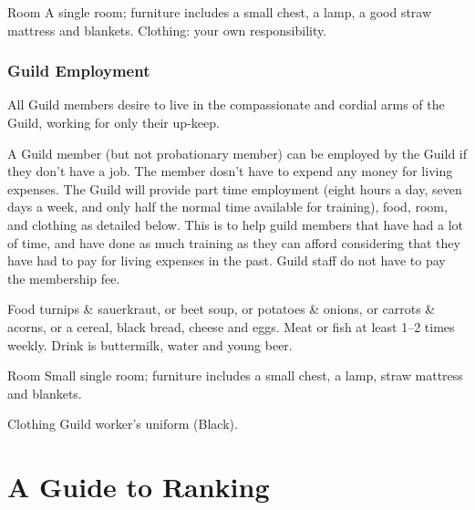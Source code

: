 \documentclass[twoside,a4paper]{article}
\begin{document}
\begin{multicols}{2}
\begin{idesc}
\item[Room] A single room; furniture includes a small chest, a lamp, a
good straw mattress and blankets.  Clothing: your own responsibility.

\end{idesc}

\subsubsection{Guild Employment}

All Guild members desire to live in the compassionate and cordial arms
of the Guild, working for only their up-keep.

A Guild member (but not probationary member) can be employed by the
Guild if they don't have a job.  The member dosn't have to expend any
money for living expenses. The Guild will provide part time employment
(eight hours a day, seven days a week, and only half the normal time
available for training), food, room, and clothing as detailed
below. This is to help guild members that have had a lot of time, and
have done as much training as they can afford considering that they
have had to pay for living expenses in the past. Guild staff do not
have to pay the membership fee.

\begin{idesc}

\item[Food] turnips \& sauerkraut, or beet soup, or potatoes \&
onions, or carrots \& acorns, or a cereal, black bread, cheese and
eggs. Meat or fish at least 1--2 times weekly. Drink is buttermilk,
water and young beer.

\item[Room] Small single room; furniture includes a small chest, a
lamp, straw mattress and blankets.

\item[Clothing] Guild worker's uniform (Black).

\end{idesc}

\raggedcolumns

\newpage

%
%

\section{A Guide to Ranking}


\end{multicols}
\end{document}
